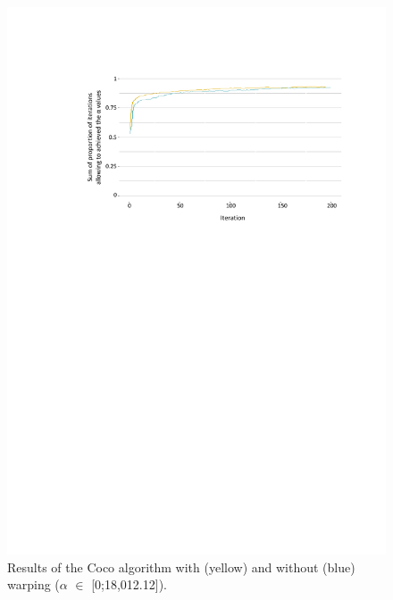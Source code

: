 \begin{figure}[!ht]
	\centering
	\includegraphics[trim = 4cm 16.6cm 2.2cm 3.5cm, clip, width=\textwidth]{Figures_Warping_resultats_courbes_algoCoco_0_18000.pdf}
	\caption{Results of the Coco algorithm with (yellow) and without (blue) warping ($\alpha$ $\in$ [0;18,012.12]).}\label{fig:algococo0}
\end{figure}

